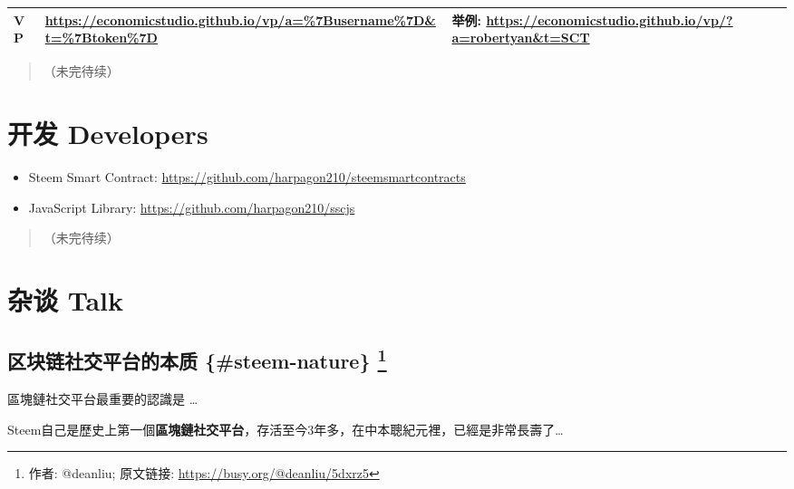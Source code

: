 \documentclass[]{ctexbook}
\providecommand{\tightlist}{%
  \setlength{\itemsep}{0pt}\setlength{\parskip}{0pt}}
\begin{document}
\begin{longtable}[]{@{}lll@{}}
\begin{minipage}[t]{0.30\columnwidth}\raggedright
VP\strut
\end{minipage} & \begin{minipage}[t]{0.30\columnwidth}\raggedright
\url{https://economicstudio.github.io/vp/a=\%7Busername\%7D\&t=\%7Btoken\%7D}\strut
\end{minipage} & \begin{minipage}[t]{0.30\columnwidth}\raggedright
举例: \url{https://economicstudio.github.io/vp/?a=robertyan\&t=SCT}\strut
\end{minipage}\tabularnewline
\bottomrule
\end{longtable}

\begin{quote}
（未完待续）
\end{quote}

\hypertarget{developer}{%
\chapter{开发 Developers}\label{developer}}

\begin{itemize}
\tightlist
\item
  Steem Smart Contract: \url{https://github.com/harpagon210/steemsmartcontracts}
\item
  JavaScript Library: \url{https://github.com/harpagon210/sscjs}
\end{itemize}

\begin{quote}
（未完待续）
\end{quote}

\hypertarget{talk}{%
\chapter{杂谈 Talk}\label{talk}}

\hypertarget{-steem-nature}{%
\section[区块链社交平台的本质 \{\#steem-nature\} ]{\texorpdfstring{区块链社交平台的本质 \{\#steem-nature\} \footnote{作者: @deanliu; 原文链接: \url{https://busy.org/@deanliu/5dxrz5}}}{区块链社交平台的本质 \{\#steem-nature\} }}\label{-steem-nature}}

區塊鏈社交平台最重要的認識是 \ldots{}

Steem自己是歷史上第一個\textbf{區塊鏈社交平台}，存活至今3年多，在中本聰紀元裡，已經是非常長壽了\ldots{}
\end{document}
